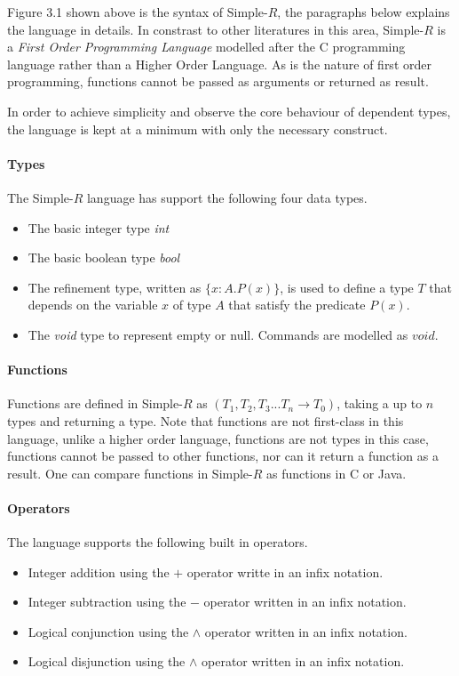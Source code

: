 \documentclass[a4paper,12pt]{report}
\begin{document}
\par
Figure 3.1 shown above is the syntax of Simple-$R$, the paragraphs below 
explains the language in details. In constrast to other literatures in this area, 
Simple-$R$ is a \textit{First Order Programming Language} \cite{FOL} modelled 
after the C programming language rather than a Higher Order Language. As is the 
nature of first order programming, functions cannot be passed as arguments or 
returned as result. 

\par
In order to achieve simplicity and observe the core behaviour of dependent 
types, the language is kept at a minimum with only the necessary construct. 

\paragraph{Types} The Simple-$R$ language has support the following four data types. 
\begin{itemize}
  \item The basic integer type \textit{int}
  \item The basic boolean type \textit{bool}
  \item The refinement type, written as $\{x: A.P(x)\}$, is used to 
  define a type $T$ that depends on the variable $x$ of type 
  $A$ that satisfy the predicate $P(x)$.
  \item The \textit{void} type to represent empty or null. Commands are modelled 
  as $void$.
\end{itemize}

\paragraph{Functions}
Functions are defined in Simple-$R$ as $(T_1, T_2,T_3...T_n \longrightarrow T_0)$, 
taking a up to $n$ types and returning a type. Note that functions are 
not first-class in this language, unlike a higher order 
language, functions are not types in this case, functions cannot be passed to 
other functions, nor can it return a function as a result. One can compare 
functions in Simple-$R$ as functions in C or Java. 

\paragraph{Operators}
The language supports the following built in operators.
\begin{itemize}
  \item Integer addition using the $+$ operator writte in an infix notation.
  \item Integer subtraction using the $-$ operator written in an infix notation.
  \item Logical conjunction using the $\wedge$ operator written in an infix 
  notation.
  \item Logical disjunction using the $\wedge$ operator written in an infix 
  notation.
\end{itemize}
\end{document}
